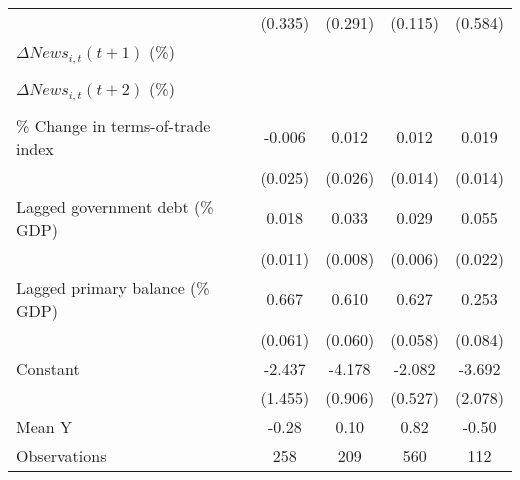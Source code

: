 {\begin{tabular}{l*{4}{c}}
                    &     (0.335)         &     (0.291)         &     (0.115)         &     (0.584)         \\
\addlinespace
$ \Delta News_{i,t}(t+1)$ (\%)&                     &                     &                     &                     \\
                    &                     &                     &                     &                     \\
\addlinespace
$ \Delta News_{i,t}(t+2)$ (\%)&                     &                     &                     &                     \\
                    &                     &                     &                     &                     \\
\addlinespace
\% Change in terms-of-trade index&      -0.006         &       0.012         &       0.012         &       0.019         \\
                    &     (0.025)         &     (0.026)         &     (0.014)         &     (0.014)         \\
\addlinespace
Lagged government debt (\% GDP)&       0.018         &       0.033\sym{***}&       0.029\sym{***}&       0.055\sym{**} \\
                    &     (0.011)         &     (0.008)         &     (0.006)         &     (0.022)         \\
\addlinespace
Lagged primary balance (\% GDP)&       0.667\sym{***}&       0.610\sym{***}&       0.627\sym{***}&       0.253\sym{***}\\
                    &     (0.061)         &     (0.060)         &     (0.058)         &     (0.084)         \\
\addlinespace
Constant            &      -2.437         &      -4.178\sym{***}&      -2.082\sym{***}&      -3.692\sym{*}  \\
                    &     (1.455)         &     (0.906)         &     (0.527)         &     (2.078)         \\
\midrule
Mean Y              &       -0.28         &        0.10         &        0.82         &       -0.50         \\
Observations        &         258         &         209         &         560         &         112         \\
\bottomrule
\end{tabular}
}
